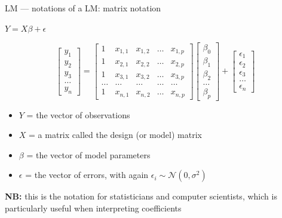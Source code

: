 \documentclass[
  10pt,
  ignorenonframetext,
  aspectratio=169,
  t]{beamer}
\providecommand{\tightlist}{%
  \setlength{\itemsep}{0pt}\setlength{\parskip}{0pt}}
\begin{document}
\begin{frame}{LM --- notations of a LM: matrix notation}
\protect{}\label{lm-notations-of-a-lm-matrix-notation}
\vspace{1em}

\begin{center}
$Y = X \beta + \epsilon$
\end{center}

\[
\begin{bmatrix} y_1 \\ y_2 \\ y_3 \\ \dots \\ y_n \end{bmatrix} =
\begin{bmatrix}
1 & x_{1,1} & x_{1,2} & \dots & x_{1,p} \\
1 & x_{2,1} & x_{2,2} & \dots & x_{2,p} \\
1 & x_{3,1} & x_{3,2} & \dots & x_{3,p} \\
\dots & \dots & \dots & \dots & \dots \\
1 & x_{n,1} & x_{n,2} & \dots & x_{n,p}
\end{bmatrix}
\begin{bmatrix}
\beta_0 \\ \beta_1 \\ \beta_2 \\ \dots \\ \beta_p
\end{bmatrix} +
\begin{bmatrix}
\epsilon_1 \\ \epsilon_2 \\ \epsilon_3 \\ \dots \\ \epsilon_n
\end{bmatrix}
\]

\pause

\begin{itemize}
\tightlist
\item
  \(Y\) = the vector of observations
\item
  \(X\) = a matrix called the design (or model) matrix
\item
  \(\beta\) = the vector of model parameters
\item
  \(\epsilon\) = the vector of errors, with again
  \(\epsilon_i \sim \mathcal{N}(0, \sigma^2)\)
\end{itemize}

\vspace{1em}

\textbf{NB:} this is the notation for statisticians and computer
scientists, which is particularly useful when interpreting coefficients
\end{frame}
\end{document}
